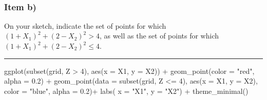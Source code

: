 \documentclass[
  a4paperpaper,
]{article}
\newenvironment{Shaded}{\begin{snugshade}}{\end{snugshade}}
\newcommand{\AttributeTok}[1]{\textcolor[rgb]{0.40,0.45,0.13}{#1}}
\newcommand{\DecValTok}[1]{\textcolor[rgb]{0.68,0.00,0.00}{#1}}
\newcommand{\FloatTok}[1]{\textcolor[rgb]{0.68,0.00,0.00}{#1}}
\newcommand{\FunctionTok}[1]{\textcolor[rgb]{0.28,0.35,0.67}{#1}}
\newcommand{\NormalTok}[1]{\textcolor[rgb]{0.00,0.23,0.31}{#1}}
\newcommand{\SpecialCharTok}[1]{\textcolor[rgb]{0.37,0.37,0.37}{#1}}
\newcommand{\StringTok}[1]{\textcolor[rgb]{0.13,0.47,0.30}{#1}}
\begin{document}
\begin{figure}[H]


\caption{\label{fig-q2a}}

\end{figure}%

~

\subsubsection{Item b)}\label{item-b-1}

On your sketch, indicate the set of points for which
\((1 + X_1)^2 + (2 − X_2)^2 > 4\), as well as the set of points for
which \((1 + X_1)^2 + (2 − X_2)^2 \leq 4\).

\begin{center}\rule{0.5\linewidth}{0.5pt}\end{center}

\begin{Shaded}
\begin{Highlighting}[]
\FunctionTok{ggplot}\NormalTok{(}\FunctionTok{subset}\NormalTok{(grid, Z }\SpecialCharTok{\textgreater{}} \DecValTok{4}\NormalTok{), }\FunctionTok{aes}\NormalTok{(}\AttributeTok{x =}\NormalTok{ X1, }\AttributeTok{y =}\NormalTok{ X2)) }\SpecialCharTok{+}
  \FunctionTok{geom\_point}\NormalTok{(}\AttributeTok{color =} \StringTok{"red"}\NormalTok{, }\AttributeTok{alpha =} \FloatTok{0.2}\NormalTok{) }\SpecialCharTok{+}
  \FunctionTok{geom\_point}\NormalTok{(}\AttributeTok{data =} \FunctionTok{subset}\NormalTok{(grid, Z }\SpecialCharTok{\textless{}=} \DecValTok{4}\NormalTok{), }\FunctionTok{aes}\NormalTok{(}\AttributeTok{x =}\NormalTok{ X1, }\AttributeTok{y =}\NormalTok{ X2), }\AttributeTok{color =} \StringTok{"blue"}\NormalTok{, }\AttributeTok{alpha =} \FloatTok{0.2}\NormalTok{)}\SpecialCharTok{+}
  \FunctionTok{labs}\NormalTok{(}
       \AttributeTok{x =} \StringTok{"X1"}\NormalTok{, }\AttributeTok{y =} \StringTok{"X2"}\NormalTok{) }\SpecialCharTok{+}
  \FunctionTok{theme\_minimal}\NormalTok{()}
\end{Highlighting}
\end{Shaded}
\end{document}
